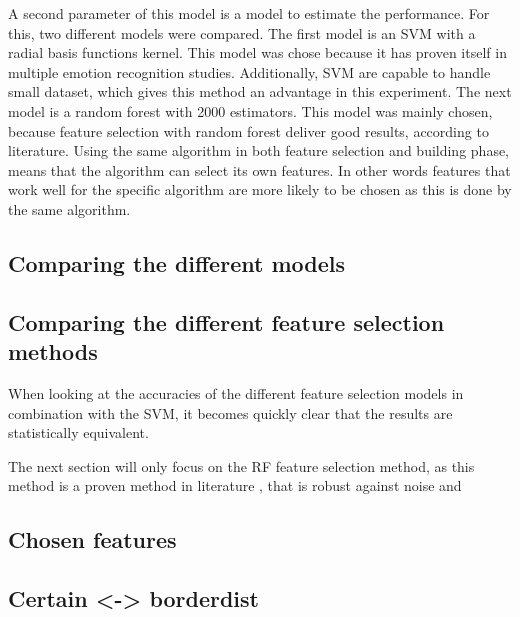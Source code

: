 \npar

A second parameter of this model is a model to estimate the performance. For this, two different models were compared. The first model is an SVM with a radial basis functions kernel. This model was chose because it has proven itself in multiple emotion recognition studies. Additionally, SVM are capable to handle small dataset, which gives this method an advantage in this experiment. The next model is a random forest with 2000 estimators. This model was mainly chosen, because feature selection with random forest deliver good results, according to literature\citep{rfPaper}. Using the same algorithm in both feature selection and building phase, means that the algorithm can select its own features. In other words features that work well for the specific algorithm are more likely to be chosen as this is done by the same algorithm.

\subsection{Comparing the different models}

\subsection{Comparing the different feature selection methods}

When looking at the accuracies of the different feature selection models in combination with the SVM, it becomes quickly clear that the results are statistically equivalent. 





The next section will only focus on the RF feature selection method, as this method is a proven method in literature \citep{rfPaper}, that is robust against noise and 


\subsection{Chosen features}

\subsection{Certain <-> borderdist}

